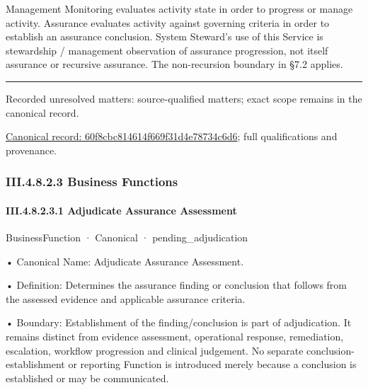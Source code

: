 Management Monitoring evaluates activity state in order to progress or manage activity. Assurance evaluates activity against governing criteria in order to establish an assurance conclusion. System Steward's use of this Service is stewardship / management observation of assurance progression, not itself assurance or recursive assurance. The non-recursion boundary in §7.2 applies.



\medskip\hrule\medskip

{\small Recorded unresolved matters: source-qualified matters; exact scope remains in the canonical record.}\par
{\footnotesize \href{../../../../continuum/business/business-service/60f8cbc814614f669f31d4e78734c6d6.md}{Canonical record: 60f8cbc814614f669f31d4e78734c6d6}; full qualifications and provenance.}\par
\subsubsection*{III.4.8.2.3 Business Functions}
\label{navigation:III.4.8.2.3}

\paragraph*{III.4.8.2.3.1 Adjudicate Assurance Assessment}
\label{navigation:III.4.8.2.3.1}

\label{element:7d7cd216415d4b839ea3edfbf1538110}
{\small BusinessFunction · Canonical · pending\_adjudication}\par

•
Canonical Name: Adjudicate Assurance Assessment.



•
Definition: Determines the assurance finding or conclusion that follows from the assessed evidence and applicable assurance criteria.



•
Boundary: Establishment of the finding/conclusion is part of adjudication. It remains distinct from evidence assessment, operational response, remediation, escalation, workflow progression and clinical judgement. No separate conclusion-establishment or reporting Function is introduced merely because a conclusion is established or may be communicated.



